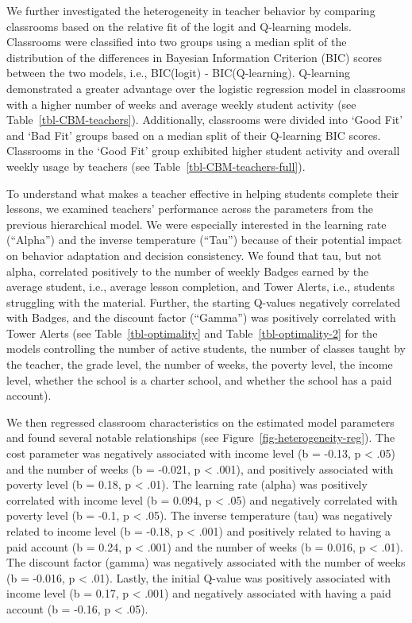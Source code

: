 \documentclass[
  number,
  preprint,
  3p,
  onecolumn]{elsarticle}
\begin{document}
We further investigated the heterogeneity in teacher behavior by
comparing classrooms based on the relative fit of the logit and
Q-learning models. Classrooms were classified into two groups using a
median split of the distribution of the differences in Bayesian
Information Criterion (BIC) scores between the two models, i.e.,
BIC(logit) - BIC(Q-learning). Q-learning demonstrated a greater
advantage over the logistic regression model in classrooms with a higher
number of weeks and average weekly student activity (see
Table~\ref{tbl-CBM-teachers}). Additionally, classrooms were divided
into `Good Fit' and `Bad Fit' groups based on a median split of their
Q-learning BIC scores. Classrooms in the `Good Fit' group exhibited
higher student activity and overall weekly usage by teachers (see
Table~\ref{tbl-CBM-teachers-full}).

To understand what makes a teacher effective in helping students
complete their lessons, we examined teachers' performance across the
parameters from the previous hierarchical model. We were especially
interested in the learning rate (``Alpha'') and the inverse temperature
(``Tau'') because of their potential impact on behavior adaptation and
decision consistency. We found that tau, but not alpha, correlated
positively to the number of weekly Badges earned by the average student,
i.e., average lesson completion, and Tower Alerts, i.e., students
struggling with the material. Further, the starting Q-values negatively
correlated with Badges, and the discount factor (``Gamma'') was
positively correlated with Tower Alerts (see Table~\ref{tbl-optimality}
and Table~\ref{tbl-optimality-2} for the models controlling the number
of active students, the number of classes taught by the teacher, the
grade level, the number of weeks, the poverty level, the income level,
whether the school is a charter school, and whether the school has a
paid account).

We then regressed classroom characteristics on the estimated model
parameters and found several notable relationships (see
Figure~\ref{fig-heterogeneity-reg}). The cost parameter was negatively
associated with income level (b = -0.13, p \textless{} .05) and the
number of weeks (b = -0.021, p \textless{} .001), and positively
associated with poverty level (b = 0.18, p \textless{} .01). The
learning rate (alpha) was positively correlated with income level (b =
0.094, p \textless{} .05) and negatively correlated with poverty level
(b = -0.1, p \textless{} .05). The inverse temperature (tau) was
negatively related to income level (b = -0.18, p \textless{} .001) and
positively related to having a paid account (b = 0.24, p \textless{}
.001) and the number of weeks (b = 0.016, p \textless{} .01). The
discount factor (gamma) was negatively associated with the number of
weeks (b = -0.016, p \textless{} .01). Lastly, the initial Q-value was
positively associated with income level (b = 0.17, p \textless{} .001)
and negatively associated with having a paid account (b = -0.16, p
\textless{} .05).
\end{document}

